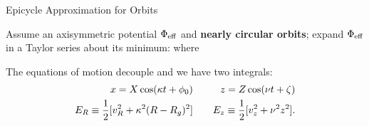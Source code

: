 \documentclass[letterpaper,landscape]{slides}
\begin{document}
%
%
%


%
%
%




\begin{slide}
\begin{center}
{\large \color{red} 
                      Epicycle Approximation for Orbits  }
\end{center}

Assume an axisymmetric potential $\Phi_{\rm eff}$ and {\bf nearly
circular orbits};
expand $\Phi_{\rm eff}$ in a Taylor series about its minimum:
where

The equations of motion decouple and we have two integrals:
\begin{eqnarray*}
x = X \cos(\kappa t + \phi_0) & \hbox{\quad} & z = Z \cos(\nu t + \zeta) \\
E_R \equiv \frac{1}{2}[v_R^2 + \kappa^2(R - R_g)^2] & \hbox{\quad} & E_z
\equiv \frac{1}{2}[v_z^2 + \nu^2 z^2].
\end{eqnarray*}

\vfill
\end{slide}


\end{document}

